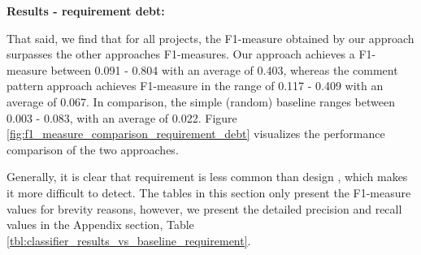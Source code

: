 \noindent \textbf{Results - requirement debt:}  
 
That said, we find that for all projects, the F1-measure obtained by our approach surpasses the other approaches F1-measures. Our approach achieves a F1-measure between 0.091 - 0.804 with an average of 0.403, whereas the comment pattern approach achieves F1-measure in the range of 0.117 - 0.409 with an average of 0.067. In comparison, the simple (random) baseline ranges between 0.003 - 0.083, with an average of 0.022. Figure \ref{fig:f1_measure_comparison_requirement_debt} visualizes the performance comparison of the two approaches. 


Generally, it is clear that requirement \SATD is less common than design \SATD, which makes it more difficult to detect. The tables in this section only present the F1-measure values for brevity reasons, however, we present the detailed precision and recall values in the Appendix section, Table \ref{tbl:classifier_results_vs_baseline_requirement}.


